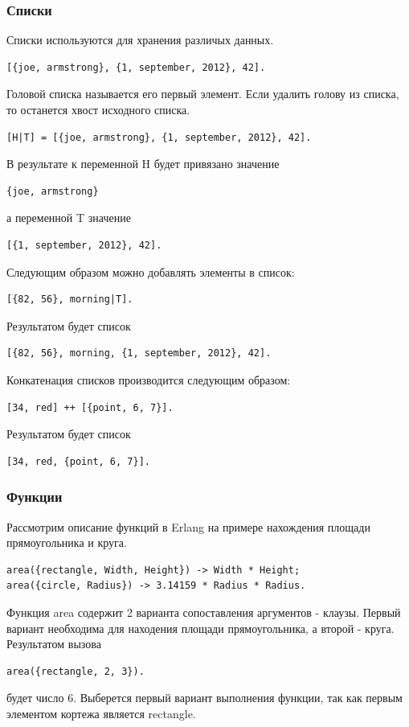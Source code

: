 		\subsubsection{Списки} 
			Списки используются для хранения различых данных.
			\begin{lstlisting}
[{joe, armstrong}, {1, september, 2012}, 42].
			\end{lstlisting}
			Головой списка называется его первый элемент. Если удалить голову из списка,
			то останется хвост исходного списка. 
			\begin{lstlisting}
[H|T] = [{joe, armstrong}, {1, september, 2012}, 42].
			\end{lstlisting}
			В результате к переменной H будет привязано значение
			\begin{lstlisting} 
{joe, armstrong}
			\end{lstlisting}
			а переменной T значение 
			\begin{lstlisting}
[{1, september, 2012}, 42].
			\end{lstlisting}
			
			Следующим образом можно добавлять элементы в список:
			\begin{lstlisting}
[{82, 56}, morning|T].
			\end{lstlisting}
			Результатом будет список
			\begin{lstlisting} 
[{82, 56}, morning, {1, september, 2012}, 42].
			\end{lstlisting}
		
			Конкатенация списков производится следующим образом:
			\begin{lstlisting}
[34, red] ++ [{point, 6, 7}].
			\end{lstlisting}
			Результатом будет список 
			\begin{lstlisting}
[34, red, {point, 6, 7}].
			\end{lstlisting}
	

		\subsubsection{Функции}
			Рассмотрим описание функций в Erlang на примере нахождения площади прямоугольника и круга.
			\begin{lstlisting}
area({rectangle, Width, Height}) -> Width * Height;
area({circle, Radius}) -> 3.14159 * Radius * Radius.
			\end{lstlisting}
			Функция area содержит 2 варианта сопоставления аргументов - клаузы. 
			Первый вариант необходима для находения площади прямоугольника, а
			второй - круга. 
			Результатом вызова 
			\begin{lstlisting}
area({rectangle, 2, 3}).
			\end{lstlisting}
			будет число 6. Выберется первый вариант выполнения функции, так как первым элементом 
			кортежа является rectangle.
			
